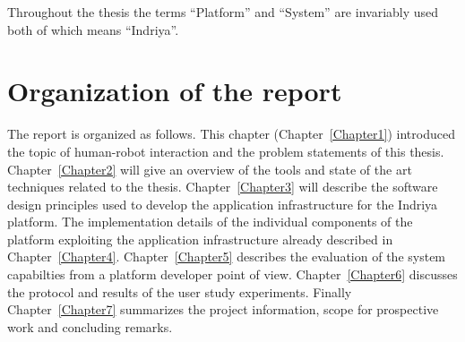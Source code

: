 Throughout the thesis the terms ``Platform'' and ``System'' are invariably used both of which means ``Indriya''.

\section{Organization of the report}
\label{sec:organization}
The report is organized as follows. This chapter (Chapter~\ref{Chapter1}) introduced the topic of human-robot interaction and the problem statements of this thesis. Chapter~\ref{Chapter2} will give an overview of the tools and state of the art techniques related to the thesis. Chapter~\ref{Chapter3} will describe the software design principles used to develop the application infrastructure for the Indriya platform. The implementation details of the individual components of the platform exploiting the application infrastructure already described in Chapter~\ref{Chapter4}. Chapter~\ref{Chapter5} describes the evaluation of the system capabilties from a platform developer point of view. Chapter~\ref{Chapter6} discusses the protocol and results of the user study experiments. Finally Chapter~\ref{Chapter7} summarizes the project information, scope for prospective work and concluding remarks.